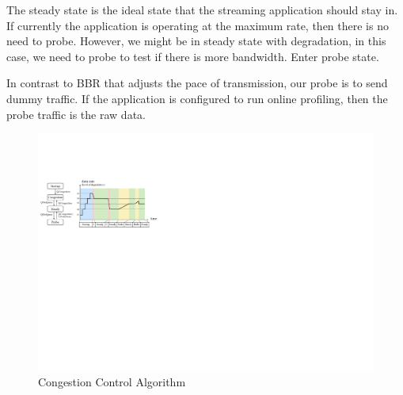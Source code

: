  The steady state is the ideal state that the streaming
application should stay in. If currently the application is operating at the
maximum rate, then there is no need to probe. However, we might be in steady
state with degradation, in this case, we need to probe to test if there is more
bandwidth. Enter probe state.

 In contrast to BBR that adjusts the pace
of transmission, our probe is to send dummy traffic. If the application is
configured to run online profiling, then the probe traffic is the raw data.

%     

\begin{figure}
  \centering
  \includegraphics[width=\columnwidth]{figures/cc.pdf}
  \caption{Congestion Control Algorithm}
  \label{fig:cc}
\end{figure}

